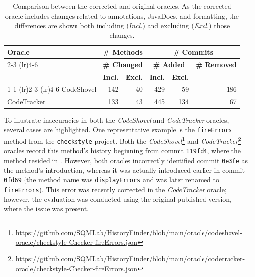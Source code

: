 \begin{table}[t]
\centering
\caption{Comparison between the corrected and original oracles. As the corrected oracle includes changes related to annotations, JavaDocs, and formatting, the differences are shown both including (\emph{Incl.}) and excluding (\emph{Excl.}) those changes.}
\label{tab:oracle-update-statistics}
\begin{tabular}{lrrrrr}
\toprule
\multirow{3}{*}{\textbf{Oracle}}

& \multicolumn{2}{c}{\textbf{\# Methods}} & \multicolumn{3}{c}{\textbf{\# Commits}}\\
\cmidrule(lr){2-3} \cmidrule(lr){4-6}

& \multicolumn{2}{c}{\textbf{\# Changed}} & \multicolumn{2}{c}{\textbf{\# Added}} & \textbf{\# Removed} \\
 & \textbf{Incl.} & \textbf{Excl.} & \textbf{Incl.} & \textbf{Excl.} & \\
\cmidrule(lr){1-1} \cmidrule(lr){2-3} \cmidrule(lr){4-6}
CodeShovel & 142 & 40 &  429 & 59 & 186 \\
CodeTracker & 133 & 43 &  445 & 134 & 67 \\
\bottomrule
\end{tabular}
\end{table}



To illustrate inaccuracies in both the \textit{CodeShovel} and \textit{CodeTracker} oracles, several cases are highlighted. One representative example is the \texttt{fireErrors} method from the \texttt{checkstyle} project. Both the \textit{CodeShovel}\footnote{\href{https://github.com/SQMLab/HistoryFinder/blob/main/oracle/codeshovel-oracle/checkstyle-Checker-fireErrors.json}{https://github.com/SQMLab/HistoryFinder/blob/main/oracle/codeshovel-oracle/checkstyle-Checker-fireErrors.json}} and \textit{CodeTracker}\footnote{\href{https://github.com/SQMLab/HistoryFinder/blob/main/oracle/codetracker-oracle/checkstyle-Checker-fireErrors.json}{https://github.com/SQMLab/HistoryFinder/blob/main/oracle/codetracker-oracle/checkstyle-Checker-fireErrors.json}} oracles record this method’s history beginning from commit \texttt{119fd4}, where the method resided in . However, both oracles incorrectly identified commit \texttt{0e3fe} as the method’s introduction, whereas it was actually introduced earlier in commit \texttt{0fd69} (the method name was \texttt{displayErrors} and was later renamed to \texttt{fireErrors}). This error was recently corrected in the \textit{CodeTracker} oracle; however, the evaluation was conducted using the original published version, where the issue was present.

